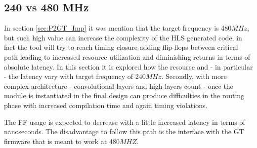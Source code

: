 \documentclass[../../main.tex]{subfiles}
\begin{document}
\subsection{240 vs 480 MHz}
\label{sec:P2GT_clock test}

In section \ref{sec:P2GT_Imp} it was mention that the target frequency is 480$MHz$, but such high value can increase the complexity of the HLS generated code, in fact the tool will try to reach timing closure adding flip-flops between critical path leading to increased resource utilization and diminishing returns in terms of absolute latency. In this section it is explored how the resource and - in particular - the latency vary with target frequency of 240$MHz$. Secondly, with more complex architecture - convolutional layers and high layers count - once the module is instantiated in the final design can produce difficulties in the routing phase with increased compilation time and again timing violations.  

The FF usage is expected to decrease with a little increased latency in terms of nanoseconds. The disadvantage to follow this path is the interface with the GT firmware that is meant to work at 480$MHZ$.
\end{document}
